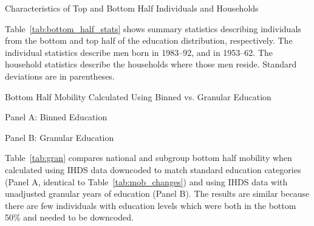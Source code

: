 \begin{landscape}
\begin{table}[H]
  \caption{Characteristics of Top and Bottom Half Individuals and Households}
  \label{tab:bottom_half_stats}
  \begin{center}
  \small 
  \end{center}

  \footnotesize{Table~\ref{tab:bottom_half_stats} shows summary statistics describing individuals from the bottom and top half of the education distribution, respectively. The individual statistics describe men born in 1983--92, and in 1953--62. The household statistics describe the households where those men reside. Standard deviations are in parentheses.}

\end{table}
\end{landscape}

\begin{table}[H]
  \caption{Bottom Half Mobility Calculated Using Binned vs. Granular Education}
  \label{tab:gran}
\begin{center}
Panel A: Binned Education
\end{center}
\begin{center}
  
\end{center}
\begin{center}
Panel B: Granular Education
\end{center}
\begin{center}
  
\end{center}
\footnotesize{Table~\ref{tab:gran} compares national
  and subgroup bottom half mobility when calculated using IHDS
  data downcoded to match standard education categories (Panel A, identical to Table~\ref{tab:mob_changes}) and using IHDS data with
  unadjusted granular years of education (Panel B). The results are similar because there are few individuals with education levels which were both in the bottom 50\% and needed to be downcoded.}
\end{table}



